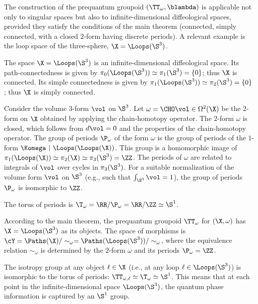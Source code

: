   
  \begin{article}
    \label{art: Example Loops S3}
    
    The construction of the prequantum groupoid $(\TT_\omega, \blambda)$ is applicable not only to singular spaces but also to infinite-dimensional diffeological spaces,
    provided they satisfy the conditions of the main theorem (connected, simply connected, with a closed $2$-form having discrete periods).
    A relevant example is the loop space of the three-sphere,
    $\X = \Loops(\S^3)$.
    
    The space $\X = \Loops(\S^3)$ is an infinite-dimensional diffeological space.
    Its path-connectedness is given by $\pi_0(\Loops(\S^3)) \simeq \pi_1(\S^3) = \{0\}$;
    thus $\X$ is connected.
    Its simple connectedness is given by $\pi_1(\Loops(\S^3)) \simeq \pi_2(\S^3) = \{0\}$;
    thus $\X$ is simply connected.
    
    Consider the volume $3$-form $\vol$ on $\S^3$.
    Let $\omega = \CHO\vol \in \Omega^2(\X)$ be the $2$-form on $\X$ obtained by applying the chain-homotopy operator.
    The $2$-form $\omega$ is closed,
    which follows from $d\vol = 0$ and the properties of the chain-homotopy operator.
    The group of periods $\P_\omega$ of the form $\omega$ is the group of periods of the $1$-form $\Komega \restriction \Loops(\Loops(\X))$.
    This group is a homomorphic image of $\pi_1(\Loops(\X)) \simeq \pi_2(\X) \simeq \pi_3(\S^3) = \ZZ$.
    The periods of $\omega$ are related to integrals of $\vol$ over cycles in $\pi_3(\S^3)$.
    For a suitable normalization of the volume form $\vol$ on $\S^3$ (e.g., such that $\int_{\S^3} \vol = 1$),
    the group of periods $\P_\omega$ is isomorphic to $\ZZ$.
    
    The torus of periods is $\T_\omega = \RR/\P_\omega = \RR/\ZZ \simeq \S^1$.
    
    According to the main theorem,
    the prequantum groupoid $\TT_\omega$ for $(\X, \omega)$ has $\X = \Loops(\S^3)$ as its objects.
    The space of morphisms is $\cY = \Paths(\X) / \sim_\omega = \Paths(\Loops(\S^3)) / \sim_\omega$,
    where the equivalence relation $\sim_\omega$ is determined by the $2$-form $\omega$ and its periods $\P_\omega = \ZZ$.
    
    The isotropy group at any object $\ell \in \X$ (i.e., at any loop $\ell \in \Loops(\S^3)$) is isomorphic to the torus of periods:
    $\TT_{\omega, \ell} \simeq \T_\omega \simeq \S^1$.
    This means that at each point in the infinite-dimensional space $\Loops(\S^3)$,
    the quantum phase information is captured by an $\S^1$ group.
    

\end{article}
